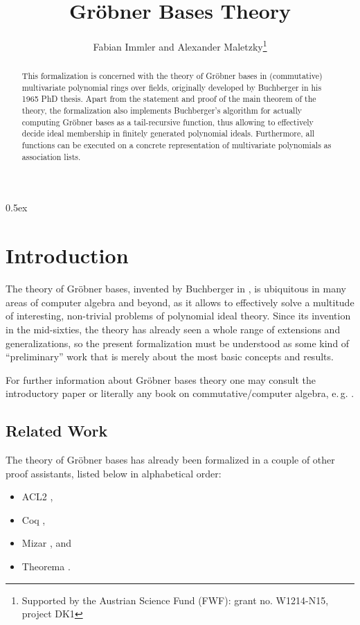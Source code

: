 \documentclass[11pt,a4paper]{article}
\begin{document}
\title{Gr\"obner Bases Theory}
\author{Fabian Immler and Alexander Maletzky\thanks{Supported by the Austrian 
Science Fund (FWF): grant no. W1214-N15, project DK1}}
\maketitle

\begin{abstract}
This formalization is concerned with the theory of Gr\"obner bases in 
(commutative) multivariate polynomial rings over fields, originally developed 
by Buchberger in his 1965 PhD thesis. Apart from the statement and proof of the 
main theorem of the theory, the formalization also implements Buchberger's 
algorithm for actually computing Gr\"obner bases as a tail-recursive function, 
thus allowing to effectively decide ideal membership in finitely generated 
polynomial ideals. Furthermore, all functions can be executed on a concrete 
representation of multivariate polynomials as association lists.
\end{abstract}

\tableofcontents

\parindent 0pt\parskip 0.5ex

\newpage
\section{Introduction}

The theory of Gr\"obner bases, invented by Buchberger in 
\cite{Buchberger1965,Buchberger1970}, is ubiquitous in many areas of 
computer algebra and beyond, as it allows to effectively solve a multitude of 
interesting, non-trivial problems of polynomial ideal theory. Since its 
invention in the mid-sixties, the theory has already seen a whole range of 
extensions and generalizations, so the present formalization must be understood 
as some kind of ``preliminary'' work that is merely about the most basic 
concepts and results.

For further information about Gr\"obner bases theory one may consult the 
introductory paper \cite{Buchberger1998a} or literally any book on 
commutative/computer algebra, e.\,g. \cite{Adams1994,Kreuzer2000}.

\subsection{Related Work}

The theory of Gr\"obner bases has already been formalized in a couple of other 
proof assistants, listed below in alphabetical order:
\begin{itemize}
 \item ACL2 \cite{Medina-Bulo2010},
 \item Coq \cite{Thery2001,Jorge2009},
 \item Mizar \cite{Schwarzweller2006}, and
 \item Theorema \cite{Buchberger2003,Maletzky2016b}.
\end{itemize}
\end{document}

